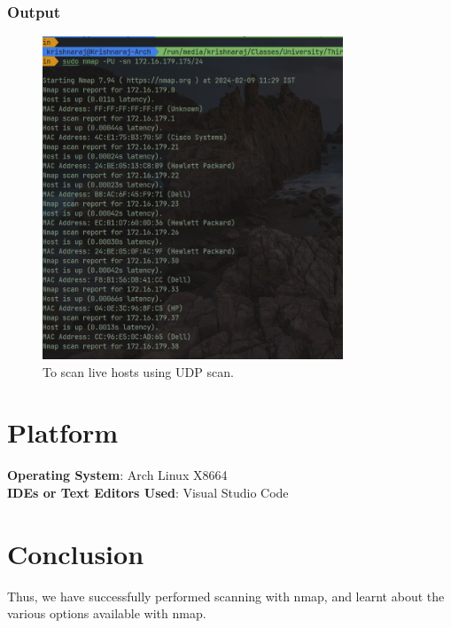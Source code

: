 \documentclass[11pt]{article}
\begin{document}
\subsubsection*{Output}
\begin{figure}[H]
    \centering
    \includegraphics[width=0.8\textwidth]{udp scan.png}
    \caption{To scan live hosts using UDP scan.}
    \label{fig:1}
\end{figure}


\section{Platform}
\textbf{Operating System}: Arch Linux X8664 \\
\textbf{IDEs or Text Editors Used}: Visual Studio Code\\

% 

\section{Conclusion}
Thus, we have successfully performed scanning with nmap, and learnt about the various options available with nmap.

\clearpage

\pagebreak
\end{document}
